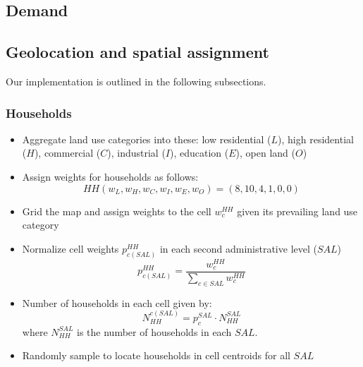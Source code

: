 \documentclass[11pt,twoside]{article}
\numberwithin{equation}{section}
\newcommand{\?}{\stackrel{?}{=}}
\newcommand{\fr}{\frac}
\begin{document}
\subsection{Demand}



\subsection{Geolocation and spatial assignment}
Our implementation is outlined in the following subsections.


\subsubsection{Households}
\begin{itemize}
  \item Aggregate land use categories into these: low residential ($L$), high residential ($H$), commercial ($C$), industrial ($I$), education ($E$), open land ($O$)
  \item Assign weights for households as follows:
    \begin{equation}
     HH (w_L, w_H, w_C, w_I, w_E, w_O) = (8, 10, 4, 1, 0, 0)
    \end{equation}
  \item Grid the map and assign weights to the cell $w_c^{HH}$ given its  prevailing land use category
  \item Normalize cell weights $p_{c(SAL)}^{HH}$ in each second administrative level ($SAL$)
    \begin{equation}
      p_{c(SAL)}^{HH} = \fr{w_c^{HH}}{\sum_{c \in SAL} w_c^{HH}}
    \end{equation}
  \item Number of households in each cell given by:
    \begin{equation}
     N_{HH}^{c(SAL)} = p_c^{SAL}\cdot N_{HH}^{SAL}
    \end{equation}
    where $ N_{HH}^{SAL}$ is the number of households in each $SAL$.
  \item Randomly sample to locate households in cell centroids for all $SAL$
  \end{itemize}
\end{document}
